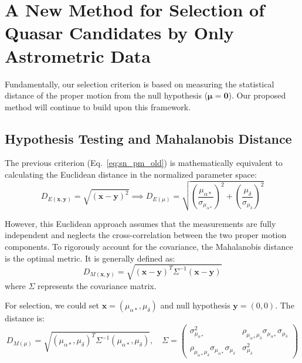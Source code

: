 \section{A New Method for Selection of Quasar Candidates by Only Astrometric Data}

Fundamentally, our selection criterion is based on measuring the statistical distance of the proper motion from the null hypothesis ($\boldsymbol{\mu} = \boldsymbol{0}$). Our proposed method will continue to build upon this framework.

\subsection{Hypothesis Testing and Mahalanobis Distance}
The previous criterion (Eq.~\ref{eq:sn_pm_old}) is mathematically equivalent to calculating the Euclidean distance in the normalized parameter space:
\begin{equation}
    D_{E(\boldsymbol{x},\boldsymbol{y})} = \sqrt{(\boldsymbol{x}-\boldsymbol{y})^2} \implies D_{E(\mu)} = \sqrt{\left(\frac{\mu_{\alpha*}}{\sigma_{\mu_{\alpha*}}}\right)^2 + \left(\frac{\mu_{\delta}}{\sigma_{\mu_{\delta}}}\right)^2}
    \label{eq:e_dist}
\end{equation}

However, this Euclidean approach assumes that the measurements are fully independent and neglects the cross-correlation between the two proper motion components. To rigorously account for the covariance, the Mahalanobis distance is the optimal metric. It is generally defined as:
\begin{equation}
    D_{M(\boldsymbol{x},\boldsymbol{y})} = \sqrt{(\boldsymbol{x}-\boldsymbol{y})^T \Sigma^{-1}(\boldsymbol{x}-\boldsymbol{y})}
    \label{eq:m_dist}
\end{equation}
where $\Sigma$ represents the covariance matrix. 

For selection, we could set $\boldsymbol{x}=(\mu_{\alpha*}, \mu_{\delta})$ and null hypothesis $\boldsymbol{y}=(0,0)$. The distance is:
\begin{equation}
    D_{M(\mu)}=\sqrt{(\mu_{\alpha*}, \mu_{\delta})^T\Sigma^{-1}(\mu_{\alpha*}, \mu_{\delta})}, \quad \Sigma=
    \begin{pmatrix}
    \sigma^2_{\mu_{\alpha*}} & \rho_{\mu_{\alpha*}\mu_{\delta}} \sigma_{\mu_{\alpha*}} \sigma_{\mu_{\delta}}  \\
    \rho_{\mu_{\alpha*}\mu_{\delta}} \sigma_{\mu_{\alpha*}} \sigma_{\mu_{\delta}} & \sigma^2_{\mu_{\delta}}
    \end{pmatrix}
    \label{eq:m_dist_pm}
\end{equation}

